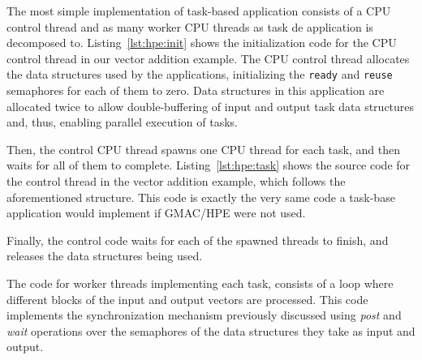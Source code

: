 

The most simple implementation of task\hyp{}based application consists of a CPU control thread and 
as many worker CPU threads as task de application is decomposed to. Listing~\ref{lst:hpe:init} shows 
the initialization code for the CPU control thread in our vector addition example. The CPU control 
thread allocates the data structures used by the applications, initializing the \texttt{ready} and 
\texttt{reuse} semaphores for each of them to zero. Data structures in this application are 
allocated twice to allow double\hyp{}buffering of input and output task data structures and, thus, 
enabling parallel execution of tasks.



Then, the control CPU thread spawns one CPU thread for each task, and then waits for all of them to 
complete. Listing~\ref{lst:hpe:task} shows the source code for the control thread in the vector 
addition example, which follows the aforementioned structure. This code is exactly the very same 
code a task\hyp{}base application would implement if GMAC\slash HPE were not used.


Finally, the control code waits for each of the spawned threads to finish, and releases the data 
structures being used.

The code for worker threads implementing each task, consists of a loop where different blocks of the 
input and output vectors are processed. This code implements the synchronization mechanism 
previously discussed using \emph{post} and \emph{wait} operations over the semaphores of the data 
structures they take as input and output.


